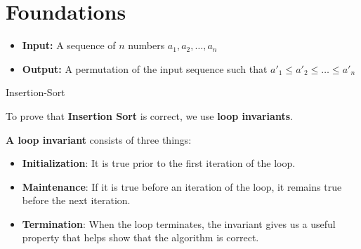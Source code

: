 \chapter{Foundations}


    \begin{itemize}
      \item \textbf{Input:} A sequence of $n$ numbers $a_{1}, a_{2}, \ldots, a_{n}$
      \item \textbf{Output:} A permutation of the input sequence such that
        $a'_{1} \leq a'_{2} \leq \ldots \leq a'_{n}$
    \end{itemize}

    \begin{algorithm}
      \caption{Insertion-Sort}
      \begin{algorithmic}[1]
        \Statex
            \ENDWHILE
          \ENDFOR
        \EndFunction
      \end{algorithmic}
    \end{algorithm}

    \par To prove that \textbf{Insertion Sort} is correct, we use \textbf{loop invariants}.
    \par \textbf{A loop invariant} consists of three things:
    \begin{itemize}
      \item \textbf{Initialization}: It is true prior to the first iteration of the loop.
      \item \textbf{Maintenance}: If it is true before an iteration of the loop, it remains
        true before the next iteration.
      \item \textbf{Termination}: When the loop terminates, the invariant gives us a useful
        property that helps show that the algorithm is correct.
    \end{itemize}


